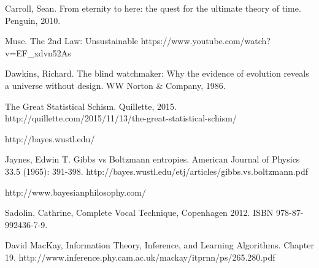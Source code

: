 \documentclass[a4paper, 12pt]{article}
\begin{document}
\begin{thebibliography}{999} %
Carroll, Sean. From eternity to here: the quest for the ultimate theory of time. Penguin, 2010.

Muse. The 2nd Law: Unsustainable
https://www.youtube.com/watch?v=EF\_xdvn52As

Dawkins, Richard. The blind watchmaker: Why the evidence of evolution reveals a universe without design. WW Norton \& Company, 1986.

 The Great Statistical Schism. Quillette, 2015.
http://quillette.com/2015/11/13/the-great-statistical-schism/

http://bayes.wustl.edu/

Jaynes, Edwin T.
Gibbs vs Boltzmann entropies. American Journal of Physics 33.5 (1965): 391-398.
http://bayes.wustl.edu/etj/articles/gibbs.vs.boltzmann.pdf

http://www.bayesianphilosophy.com/

Sadolin, Cathrine, Complete Vocal Technique, Copenhagen 2012.
ISBN 978-87-992436-7-9.

David MacKay, Information Theory, Inference, and Learning Algorithms.
Chapter 19.
http://www.inference.phy.cam.ac.uk/mackay/itprnn/ps/265.280.pdf

\end{thebibliography}
\end{document}
